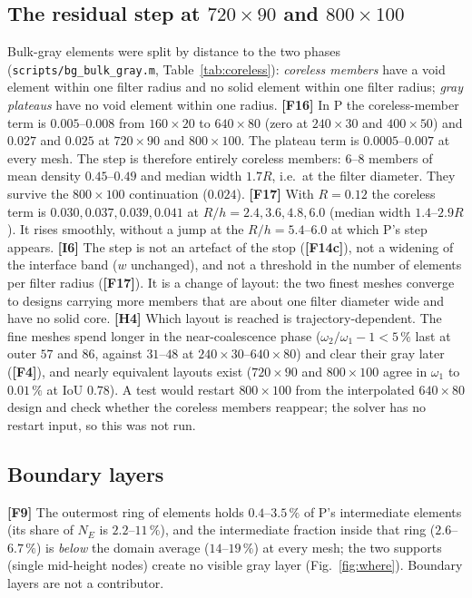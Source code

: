 \documentclass[10pt,a4paper]{article}
\newcommand{\Mnd}{M_{\mathrm{nd}}}
\newcommand{\code}[1]{\texttt{\small #1}}
\newcommand{\fact}[1]{\textbf{[F#1]}}
\newcommand{\interp}[1]{\textbf{[I#1]}}
\newcommand{\hyp}[1]{\textbf{[H#1]}}
\begin{document}
\subsection{The residual step at $720\times90$ and $800\times100$}\label{sec:step}
Bulk-gray elements were split by distance to the two phases (\code{scripts/bg\_bulk\_gray.m}, Table~\ref{tab:coreless}): \emph{coreless members} have a void element within one filter radius and no solid element within one filter radius; \emph{gray plateaus} have no void element within one radius.
\fact{16} In P the coreless-member term is $0.005$--$0.008$ from $160\times20$ to $640\times80$ (zero at $240\times30$ and $400\times50$) and $0.027$ and $0.025$ at $720\times90$ and $800\times100$. The plateau term is $0.0005$--$0.007$ at every mesh. The step is therefore entirely coreless members: $6$--$8$ members of mean density $0.45$--$0.49$ and median width $1.7R$, i.e.\ at the filter diameter. They survive the $800\times100$ continuation ($0.024$).
\fact{17} With $R=0.12$ the coreless term is $0.030,0.037,0.039,0.041$ at $R/h=2.4,3.6,4.8,6.0$ (median width $1.4$--$2.9R$). It rises smoothly, without a jump at the $R/h=5.4$--$6.0$ at which P's step appears.
\interp{6} The step is not an artefact of the stop (\fact{14c}), not a widening of the interface band ($w$ unchanged), and not a threshold in the number of elements per filter radius (\fact{17}). It is a change of layout: the two finest meshes converge to designs carrying more members that are about one filter diameter wide and have no solid core.
\hyp{4} Which layout is reached is trajectory-dependent. The fine meshes spend longer in the near-coalescence phase ($\omega_2/\omega_1-1<5\,\%$ last at outer $57$ and $86$, against $31$--$48$ at $240\times30$--$640\times80$) and clear their gray later (\fact{4}), and nearly equivalent layouts exist ($720\times90$ and $800\times100$ agree in $\omega_1$ to $0.01\,\%$ at IoU $0.78$). A test would restart $800\times100$ from the interpolated $640\times80$ design and check whether the coreless members reappear; the solver has no restart input, so this was not run.
\begin{table}[htb]\centering\footnotesize
\caption{Split of the bulk-gray term of $\Mnd$ into coreless members and gray plateaus (\code{data/bulk\_gray\_classification.csv}). members: connected groups of $\ge4$ coreless elements.}
\label{tab:coreless}

\end{table}

\subsection{Boundary layers}
\fact{9} The outermost ring of elements holds $0.4$--$3.5\,\%$ of P's intermediate elements (its share of $N_E$ is $2.2$--$11\,\%$), and the intermediate fraction inside that ring ($2.6$--$6.7\,\%$) is \emph{below} the domain average ($14$--$19\,\%$) at every mesh; the two supports (single mid-height nodes) create no visible gray layer (Fig.~\ref{fig:where}). Boundary layers are not a contributor.
\end{document}
